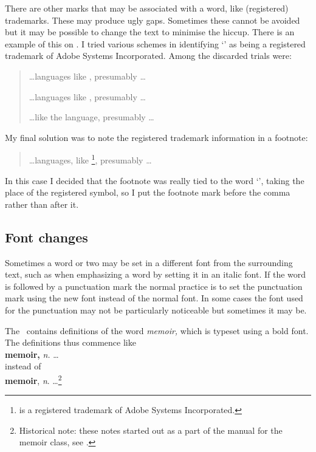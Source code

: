 \documentclass[10pt,letterpaper,extrafontsizes]{memoir}
\begin{document}
   There are other marks that may be associated with a word, like 
(registered) trademarks. These may produce ugly gaps. Sometimes these
cannot be avoided but it may be possible to change the text to minimise
the hiccup. There is an example of this on . I tried various
schemes in identifying `\pscript' as being a registered trademark of
Adobe Systems Incorporated. Among the discarded trials were:
\begin{quote}
\ldots languages like \pscript\texttrademark, presumably \ldots

\ldots languages like \pscript\textsuperscript{\textregistered}, presumably \ldots

\ldots like the \pscript\textsuperscript{\textregistered}{} language, presumably \ldots

\end{quote}
My final solution was to note the registered trademark information in
a footnote:
\begin{quote}
\ldots languages, like \pscript\footnote{\pscript{} is a registered 
trademark of Adobe Systems Incorporated.}, presumably \ldots
\end{quote}
In this case I decided that the footnote was really tied to the word
`\pscript', taking the place of the registered symbol, so I put the
footnote mark before the comma rather than after it.

\subsection{Font changes}


    Sometimes a word or two may be set in a different font from the 
surrounding text, such as when emphasizing 
a word by setting it in an
italic font. If the word is followed by a punctuation mark the normal
practice is to set the punctuation mark using the new font instead of 
the normal
font. In some cases the font used for the punctuation may not be
particularly noticeable but sometimes it may be. 

    The \pixfrontmatter\ contains definitions of the word \textit{memoir,}
which is typeset using a bold font. The definitions thus commence like \\
\hspace*{2em} \textbf{memoir,} \textit{n.} \ldots \\
instead of \\
\hspace*{2em} \textbf{memoir}, \textit{n}. \ldots\footnote{Historical
  note: these notes started out as a part of the manual for the memoir
class, see \cite{MEMMAN}.} 
\end{document}
